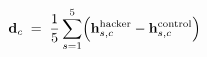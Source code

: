 \documentclass[12pt]{article}
\begin{document}
\color{tinta}
\(\displaystyle \mathbf{d}_c \;=\; \frac{1}{5}\sum_{s=1}^{5}\Bigl(\mathbf{h}^{\mathrm{hacker}}_{s,c}-\mathbf{h}^{\mathrm{control}}_{s,c}\Bigr)\)
\end{document}
